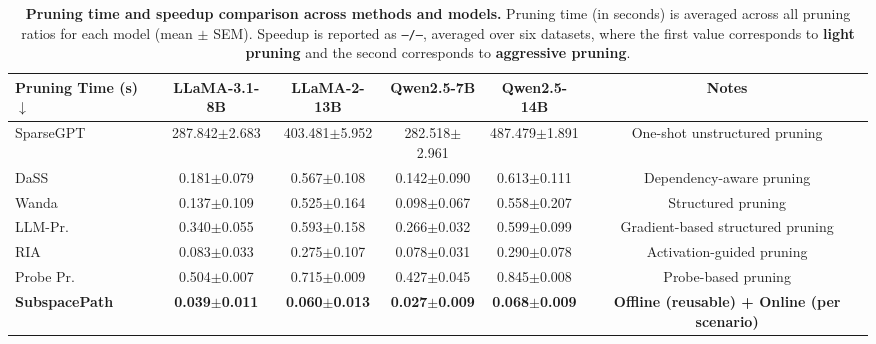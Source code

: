 \begin{table}[!t]
\caption{\textbf{Pruning time and speedup comparison across methods and models.}
Pruning time (in seconds) is averaged across all pruning ratios for each model (mean $\pm$ SEM).
Speedup is reported as \texttt{--/--}, averaged over six datasets, where the first value corresponds to \textbf{light pruning} and the second corresponds to \textbf{aggressive pruning}.}
\vspace{-2mm}
\centering
\footnotesize
\setlength{\tabcolsep}{2.5pt}
\renewcommand{\arraystretch}{1.05}
\begin{tabular}{l c c c c c}
\toprule
\textbf{Pruning Time (s) $\downarrow$} & \textbf{LLaMA-3.1-8B} & \textbf{LLaMA-2-13B} & \textbf{Qwen2.5-7B} & \textbf{Qwen2.5-14B} & \textbf{Notes} \\
\midrule
SparseGPT & 287.842{\scriptsize$\pm$}2.683 & 403.481{\scriptsize$\pm$}5.952 & 282.518{\scriptsize$\pm$}2.961 & 487.479{\scriptsize$\pm$}1.891 & One-shot unstructured pruning \\
DaSS & 0.181{\scriptsize$\pm$}0.079 & 0.567{\scriptsize$\pm$}0.108 & 0.142{\scriptsize$\pm$}0.090 & 0.613{\scriptsize$\pm$}0.111 & Dependency-aware pruning \\
Wanda & 0.137{\scriptsize$\pm$}0.109 & 0.525{\scriptsize$\pm$}0.164 & 0.098{\scriptsize$\pm$}0.067 & 0.558{\scriptsize$\pm$}0.207 & Structured pruning \\
LLM-Pr. & 0.340{\scriptsize$\pm$}0.055 & 0.593{\scriptsize$\pm$}0.158 & 0.266{\scriptsize$\pm$}0.032 & 0.599{\scriptsize$\pm$}0.099 & Gradient-based structured pruning \\
RIA & 0.083{\scriptsize$\pm$}0.033 & 0.275{\scriptsize$\pm$}0.107 & 0.078{\scriptsize$\pm$}0.031 & 0.290{\scriptsize$\pm$}0.078 & Activation-guided pruning \\
Probe Pr. & 0.504{\scriptsize$\pm$}0.007 & 0.715{\scriptsize$\pm$}0.009 & 0.427{\scriptsize$\pm$}0.045 & 0.845{\scriptsize$\pm$}0.008 & Probe-based pruning \\
\rowcolor{icmlblue} \textbf{SubspacePath} & \textbf{0.039{\scriptsize$\pm$0.011}} & \textbf{0.060{\scriptsize$\pm$0.013}} & \textbf{0.027{\scriptsize$\pm$0.009}} & \textbf{0.068{\scriptsize$\pm$0.009}} & \textbf{Offline (reusable) + Online (per scenario)} \\


\end{tabular}
\end{table}
